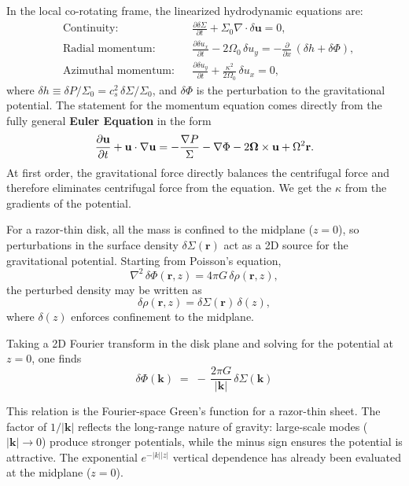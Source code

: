 In the local co-rotating frame, the linearized hydrodynamic equations are:
\begin{align*}
&\text{Continuity:} && \frac{\partial \delta\Sigma}{\partial t} + \Sigma_0 \nabla\cdot\delta\mathbf{u} = 0,\\[4pt]
&\text{Radial momentum:} && \frac{\partial \delta u_x}{\partial t} - 2\Omega_0\,\delta u_y = -\frac{\partial}{\partial x}\,(\delta h + \delta\Phi),\\[4pt]
&\text{Azimuthal momentum:} && \frac{\partial \delta u_y}{\partial t} + \frac{\kappa^2}{2\Omega_0}\,\delta u_x = 0,
\end{align*}
where $\delta h \equiv \delta P/\Sigma_0 = c_s^2\,\delta\Sigma/\Sigma_0$,  and $\delta\Phi$ is the perturbation to the gravitational potential. The statement for the momentum equation comes directly from the fully general \textbf{Euler Equation} in the form
\[
\frac{\partial {\bf u}}{\partial t} +{\bf u}\cdot{\nabla {\bf u}} = - \frac{\nabla P}{\Sigma} - \nabla \Phi - 2\boldsymbol{\Omega} \times {\bf u} + \Omega^2 {\bf r}.
\]
At first order, the gravitational force directly balances the centrifugal force and therefore eliminates centrifugal force from the equation. We get the $\kappa$ from the gradients of the potential.
\par
For a razor-thin disk, all the mass is confined to the midplane ($z=0$), so 
perturbations in the surface density $\delta\Sigma(\mathbf{r})$ act as a 2D source for 
the gravitational potential. Starting from Poisson’s equation,
\[
\nabla^2 \,\delta\Phi(\mathbf{r},z) = 4\pi G\,\delta\rho(\mathbf{r},z),
\]
the perturbed density may be written as
\[
\delta\rho(\mathbf{r},z) = \delta\Sigma(\mathbf{r})\,\delta(z),
\]
where $\delta(z)$ enforces confinement to the midplane. 

Taking a 2D Fourier transform in the disk plane and solving for the potential at 
$z=0$, one finds
\begin{equation}
\boxed{\;\;
\delta\Phi(\mathbf{k}) \;=\; -\,\frac{2\pi G}{|\mathbf{k}|}\,\delta\Sigma(\mathbf{k})
\;\;}
\label{eq:toomre_potential}
\end{equation}

This relation is the Fourier-space Green’s function for a razor-thin sheet. 
The factor of $1/|\mathbf{k}|$ reflects the long-range nature of gravity: 
large-scale modes ($|\mathbf{k}| \to 0$) produce stronger potentials, while the 
minus sign ensures the potential is attractive. The exponential $e^{-|k||z|}$ 
vertical dependence has already been evaluated at the midplane ($z=0$). 


